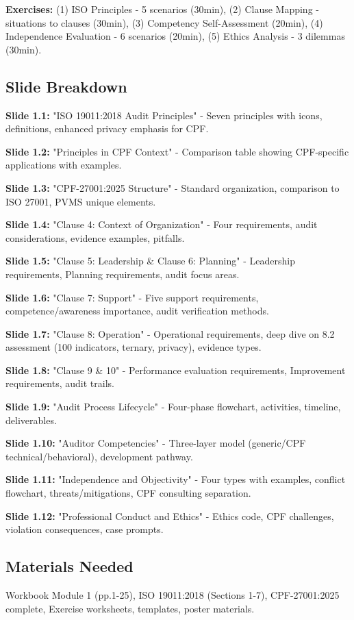 \documentclass[11pt,a4paper]{article}
\begin{document}
\textbf{Exercises:} (1) ISO Principles - 5 scenarios (30min), (2) Clause Mapping - situations to clauses (30min), (3) Competency Self-Assessment (20min), (4) Independence Evaluation - 6 scenarios (20min), (5) Ethics Analysis - 3 dilemmas (30min).

\subsection{Slide Breakdown}

\textbf{Slide 1.1:} "ISO 19011:2018 Audit Principles" - Seven principles with icons, definitions, enhanced privacy emphasis for CPF.

\textbf{Slide 1.2:} "Principles in CPF Context" - Comparison table showing CPF-specific applications with examples.

\textbf{Slide 1.3:} "CPF-27001:2025 Structure" - Standard organization, comparison to ISO 27001, PVMS unique elements.

\textbf{Slide 1.4:} "Clause 4: Context of Organization" - Four requirements, audit considerations, evidence examples, pitfalls.

\textbf{Slide 1.5:} "Clause 5: Leadership \& Clause 6: Planning" - Leadership requirements, Planning requirements, audit focus areas.

\textbf{Slide 1.6:} "Clause 7: Support" - Five support requirements, competence/awareness importance, audit verification methods.

\textbf{Slide 1.7:} "Clause 8: Operation" - Operational requirements, deep dive on 8.2 assessment (100 indicators, ternary, privacy), evidence types.

\textbf{Slide 1.8:} "Clause 9 \& 10" - Performance evaluation requirements, Improvement requirements, audit trails.

\textbf{Slide 1.9:} "Audit Process Lifecycle" - Four-phase flowchart, activities, timeline, deliverables.

\textbf{Slide 1.10:} "Auditor Competencies" - Three-layer model (generic/CPF technical/behavioral), development pathway.

\textbf{Slide 1.11:} "Independence and Objectivity" - Four types with examples, conflict flowchart, threats/mitigations, CPF consulting separation.

\textbf{Slide 1.12:} "Professional Conduct and Ethics" - Ethics code, CPF challenges, violation consequences, case prompts.

\subsection{Materials Needed}
Workbook Module 1 (pp.1-25), ISO 19011:2018 (Sections 1-7), CPF-27001:2025 complete, Exercise worksheets, templates, poster materials.
\end{document}
